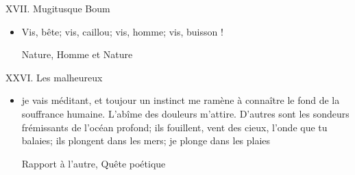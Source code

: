 \documentclass[french,a4paper,11pt,answers]{exam}
\newcommand{\cit}[2]{\og #1 \fg{} \begin{solution}{ #2 }\end{solution}} %
\begin{document}
	\begin{cadre}{XVII. Mugitusque Boum}
		\begin{itemize}
			\item \cit{Vis, bête; vis, caillou; vis, homme; vis, buisson !}
				{Nature, Homme et Nature}
		\end{itemize}
	\end{cadre}
	
	\begin{cadre}{XXVI. Les malheureux}
		\begin{itemize}
			\item \cit{je vais méditant, et toujour un instinct me ramène à connaître le fond de la souffrance humaine. L'abîme des douleurs m'attire. D'autres sont les sondeurs frémissants de l'océan profond; ils fouillent, vent des cieux, l'onde que tu balaies; ils plongent dans les mers; je plonge dans les plaies}
				{Rapport à l'autre, Quête poétique}
		\end{itemize}
	\end{cadre}
	
\end{document}
